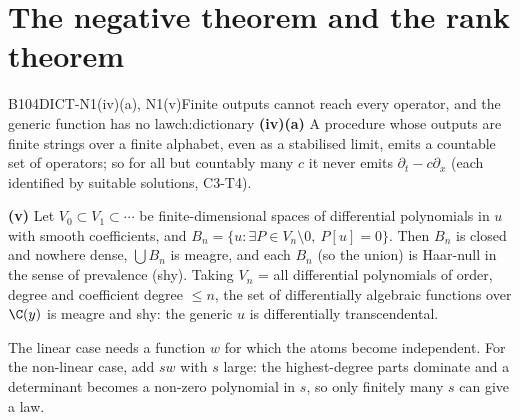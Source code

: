 \section{The negative theorem and the rank theorem}

\begin{dimcard}{B104}{DICT-N1(iv)(a), N1(v)}{Finite outputs cannot reach every operator, and the generic function has no law}{\pw}{ch:dictionary}
\textbf{(iv)(a)} A procedure whose outputs are finite strings over a finite alphabet, even as a stabilised limit, emits a countable set of operators; so for all but countably many $c$ it never emits $\partial_t-c\partial_x$ (each identified by suitable solutions, C3-T4).

\textbf{(v)} Let $V_0\subset V_1\subset\cdots$ be finite-dimensional spaces of differential polynomials in $u$ with smooth coefficients, and $B_n=\{u:\exists P\in V_n\setminus0,\ P[u]=0\}$. Then $B_n$ is closed and nowhere dense, $\bigcup B_n$ is meagre, and each $B_n$ (so the union) is Haar-null in the sense of prevalence (shy). Taking $V_n$ = all differential polynomials of order, degree and coefficient degree $\le n$, the set of differentially algebraic functions over $\C(y)$ is meagre and shy: the generic $u$ is differentially transcendental.
\end{dimcard}

\begin{proofidea}
The linear case needs a function $w$ for which the atoms become independent. For the non-linear case, add $sw$ with $s$ large: the highest-degree parts dominate and a determinant becomes a non-zero polynomial in $s$, so only finitely many $s$ can give a law.
\end{proofidea}

